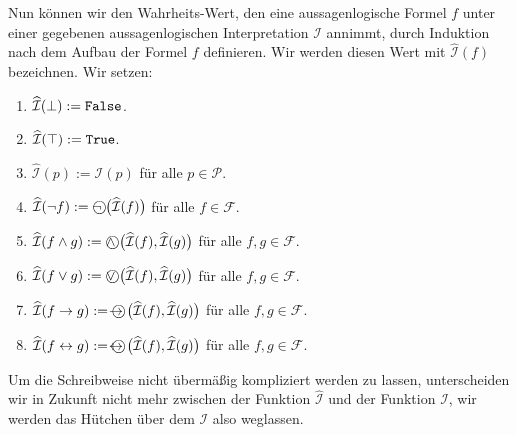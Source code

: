\begin{table}[!ht]
  \centering
{}
  \caption{Interpretation der Junktoren}
  \label{tab:aussagen-logik}
\end{table}
Nun können wir den Wahrheits-Wert, den eine aussagenlogische Formel $f$ unter einer gegebenen
aussagenlogischen Interpretation $\mathcal{I}$ annimmt, durch Induktion nach dem Aufbau
der Formel $f$ definieren.  Wir werden diesen Wert mit $\widehat{\mathcal{I}}(f)$ 
bezeichnen.  Wir setzen:
\begin{enumerate}
\item $\widehat{\mathcal{I}}(\bot) := \texttt{False}$.
\item $\widehat{\mathcal{I}}(\top) := \texttt{True}$.
\item $\widehat{\mathcal{I}}(p) := \mathcal{I}(p)$ für alle $p \in \mathcal{P}$.
\item $\widehat{\mathcal{I}}(\neg f) := \circneg\;\bigl(\widehat{\mathcal{I}}(f)\bigr)$ für alle $f \in \mathcal{F}$.
\item $\widehat{\mathcal{I}}(f \wedge g) := \circwedge\;\bigl(\widehat{\mathcal{I}}(f), \widehat{\mathcal{I}}(g)\bigr)$ 
      für alle $f, g \in \mathcal{F}$.
\item $\widehat{\mathcal{I}}(f \vee g) := \circvee\;\bigl(\widehat{\mathcal{I}}(f), \widehat{\mathcal{I}}(g)\bigr)$ 
      für alle $f, g \in \mathcal{F}$.
\item $\widehat{\mathcal{I}}(f \rightarrow g) := \circright\;\bigl(\widehat{\mathcal{I}}(f), \widehat{\mathcal{I}}(g)\bigr)$ 
      für alle $f, g \in \mathcal{F}$.
\item $\widehat{\mathcal{I}}(f \leftrightarrow g) := \circleftright\;\bigl(\widehat{\mathcal{I}}(f), \widehat{\mathcal{I}}(g)\bigr)$ 
      für alle $f, g \in \mathcal{F}$.
\end{enumerate}
Um die Schreibweise nicht übermäßig kompliziert werden zu lassen, unterscheiden wir in
Zukunft nicht  mehr zwischen der Funktion $\widehat{\mathcal{I}}$ und der Funktion $\mathcal{I}$, wir werden das Hütchen über dem
$\mathcal{I}$ also weglassen.


